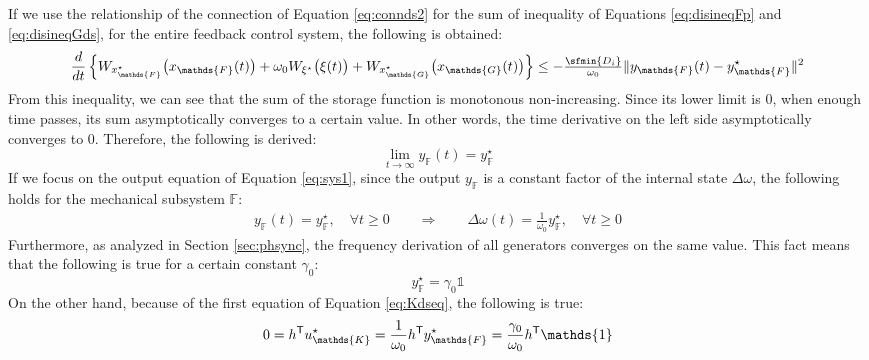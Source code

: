 \documentclass[graybox, envcountchap]{svmult}
\begin{document}
If we use the relationship of the connection of Equation \ref{eq:connds2} for the sum of inequality of Equations \ref{eq:disineqFp} and \ref{eq:disineqGds}, for the entire feedback control system, the following is obtained:
\[
 \frac{d}{dt}  \left\{
W_{x^{\star}_{\mathds{F}}}  \bigl( x_{\mathds{F}}(t) \bigr) 
+
\omega_0
W_{\xi^{\star}} \bigl( \xi(t) \bigr) 
+
W_{x^{\star}_{\mathds{G}}} \bigl(x_{\mathds{G}}(t) \bigr)
\right\} 
 \leq 
- \tfrac{\sfmin \left\{ D_i \right\}}{\omega_0}
\|y_{\mathds{F}}(t) -y^{\star}_{\mathds{F}}\|^2
\]
From this inequality, we can see that the sum of the storage function is monotonous non-increasing.
Since its lower limit is 0, when enough time passes, its sum asymptotically converges to a certain value.
In other words, the time derivative on the left side asymptotically converges to 0.
Therefore, the following is derived:
\[
\lim_{t\rightarrow \infty}
y_{\mathds{F}}(t) = y^{\star}_{\mathds{F}}
\]
If we focus on the output equation of Equation \ref{eq:sys1}, since the output $y_{\mathds{F}}$ is a constant factor of the internal state $\Delta \omega$, the following holds for the mechanical subsystem $\mathds{F}$:
\begin{align}\label{eq:Fobsnl}
y_{\mathds{F}}(t)  =y^{\star}_{\mathds{F}},\quad \forall t\geq 0 
\qquad \Longrightarrow \qquad
\Delta \omega(t)  =\frac{1}{\omega_0} y^{\star}_{\mathds{F}},\quad \forall t\geq 0 
\end{align}
Furthermore, as analyzed in Section \ref{sec:phsync}, the frequency derivation of all generators converges on the same value.
This fact means that the following is true for a certain constant $\gamma_0$:
\[
y^{\star}_{\mathds{F}} = \gamma_0 \mathds{1}
\]
On the other hand, because of the first equation of Equation \ref{eq:Kdseq}, the following is true:
\[
0=h^{\sf T} u_{\mathds{K}}^{\star} 
= \frac{1}{\omega_0}h^{\sf T} y^{\star}_{\mathds{F}}
=\frac{\gamma_0}{\omega_0} h^{\sf T} \mathds{1}
\]
\end{document}
